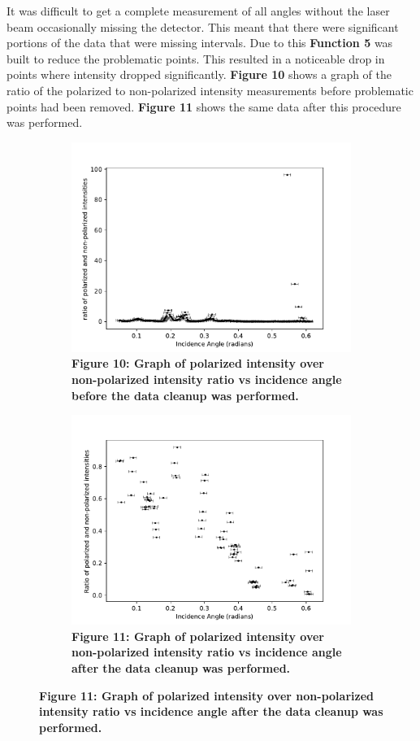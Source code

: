 \documentclass[
	letterpaper, %
	10pt, %
]{CSUniSchoolLabReport}
\begin{document}
It was difficult to get a complete measurement of all angles without the laser beam occasionally
missing the detector. This meant that there were significant portions of the data that were
missing intervals. Due to this \textbf{Function 5} was built to reduce the problematic points.
This resulted in a noticeable drop in points where intensity dropped significantly. \textbf{Figure 10}
shows a graph of the ratio of the polarized to non-polarized intensity measurements before
problematic points had been removed. \textbf{Figure 11} shows the same data after this procedure was performed.
\begin{figure}[H]
	\begin{subfigure}{0.45\textwidth}
		\centering
		\includegraphics[width=\textwidth]{../figures/figure10.pdf}
		\caption{\textbf{Figure 10: Graph of polarized intensity over non-polarized intensity ratio vs incidence angle before the data cleanup was performed.}}
	\end{subfigure}
	\hfill
	\begin{subfigure}{0.45\textwidth}
		\includegraphics[width=\textwidth]{../figures/figure11.pdf}
		\caption{\textbf{Figure 11: Graph of polarized intensity over non-polarized intensity ratio vs incidence angle after the data cleanup was performed.}}
	\end{subfigure}
\end{figure}
\end{document}
